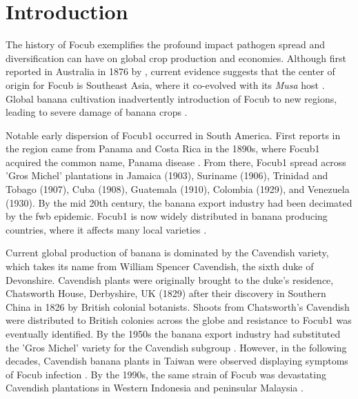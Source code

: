 
\section{Introduction}

The history of \acf{Focub} exemplifies the profound impact  pathogen spread and diversification can have on global crop production and economies. Although first reported in Australia in 1876 by \textcite{Bancroft1876}, current evidence suggests that the center of origin for \ac{Focub} is Southeast Asia, where it co-evolved with its \textit{Musa} host \parencite{Maryani2019}. Global banana cultivation   inadvertently introduction of \ac{Focub} to new regions, leading to severe damage of banana crops \parencite{Kema2021}.

Notable early dispersion of \acf{Focub1} occurred in South America. First reports in the region came from Panama and Costa Rica in the 1890s, where \ac{Focub1} acquired the common name, Panama disease \parencite{Ashby1913}. From there, \ac{Focub1}  spread across 'Gros Michel' plantations in Jamaica (1903), Suriname (1906), Trinidad and Tobago (1907), Cuba (1908), Guatemala (1910), Colombia (1929), and Venezuela (1930). By the mid 20th century, the banana export industry had been decimated by the \ac{fwb} epidemic. \Ac{Focub1} is now widely distributed in banana producing countries, where it affects many local varieties \parencite{Dita2018}.

Current global production of banana is dominated by the Cavendish variety, which takes its name from William Spencer Cavendish, the sixth duke of Devonshire. Cavendish plants were originally brought to the duke's residence, Chatsworth House, Derbyshire, UK (1829) after their discovery in Southern China in 1826 by British colonial botanists. Shoots from Chatsworth's Cavendish were distributed to British colonies across the globe and resistance to \ac{Focub1} was eventually identified. By the 1950s the banana export industry had substituted the 'Gros Michel' variety for the Cavendish subgroup \parencite{Ploetz2005, Dita2018}. However, in the following decades, Cavendish banana plants in Taiwan were observed displaying symptoms of \ac{Focub} infection \parencite{Agrios2005}. By the 1990s, the same strain of \ac{Focub} was devastating Cavendish plantations in Western Indonesia and peninsular Malaysia \parencite{Kema2021}. 

